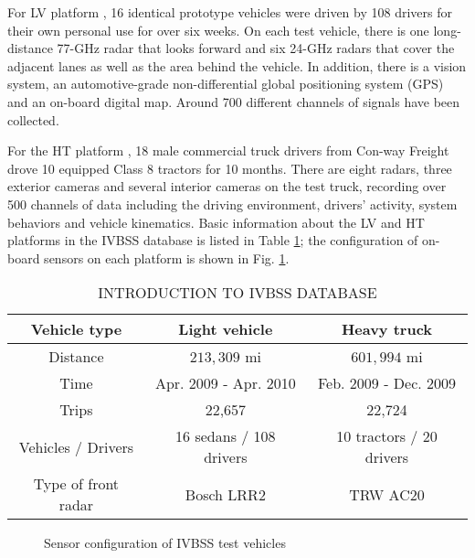\documentclass[letterpaper, 10 pt, conference]{ieeeconf}
\begin{document}
For LV platform \cite{Leblanc2011a}, 16 identical prototype vehicles were driven by 108 drivers for their own personal use for over six weeks. On each test vehicle, there is one long-distance 77-GHz radar that looks forward and six 24-GHz radars that cover the adjacent lanes as well as the area behind the vehicle. In addition, there is a vision system, an automotive-grade non-differential global positioning system (GPS) and an on-board digital map. Around 700 different channels of signals have been collected.

For the HT platform \cite{Zhao2014d}, 18 male commercial truck drivers from Con-way Freight drove 10 equipped Class 8 tractors for 10 months. There are eight radars, three exterior cameras and several interior cameras on the test truck, recording over 500 channels of data including the driving environment, drivers’ activity, system behaviors and vehicle kinematics. Basic information about the LV and HT platforms in the IVBSS database is listed in Table \ref{tbl:IVBSS}; the configuration of on-board sensors on each platform is shown in Fig. \ref{fig:SensorConfig}.

  \begin{table}
            \centering
        \caption{INTRODUCTION TO IVBSS DATABASE}
        \label{tbl:IVBSS}
        \begin{center}
        \begin{adjustbox}{max width=\linewidth}
        \begin{tabular}{c|c c}
        \hline \hline
        Vehicle type & Light vehicle & Heavy truck\\
        \hline
        Distance & $213,309$ mi & $601,994$ mi\\
        
        Time & Apr. 2009 - Apr. 2010 &Feb. 2009 - Dec. 2009 \\
        
        Trips & 22,657 & 22,724 \\
       
        Vehicles / Drivers & 16 sedans / 108 drivers & 10 tractors / 20 drivers \\
       
        Type of front radar& Bosch LRR2 & TRW AC20 \\
        \hline \hline
        \end{tabular}
        \end{adjustbox}
        \end{center}
  \end{table}
 \begin{figure}
%
%
 \centering
    \caption{Sensor configuration of IVBSS test vehicles}\label{fig:SensorConfig}
\end{figure}
\end{document}
